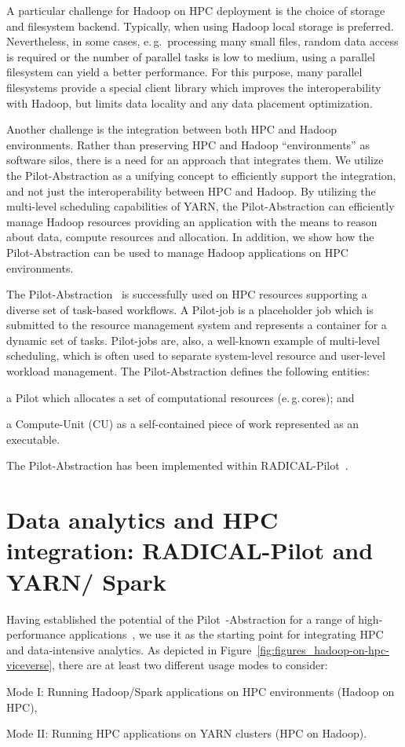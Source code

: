 A particular challenge for Hadoop on HPC deployment is the choice of storage and filesystem backend.
Typically, when using Hadoop local storage is preferred.
Nevertheless, in some cases, e.\,g.\ processing many small files, random data access is required or the number of parallel tasks is low to medium, using a parallel filesystem can yield a better performance.
For this purpose, many parallel filesystems provide a special client library which improves the interoperability with Hadoop, but limits data locality and any data placement optimization.

Another challenge is the integration between both HPC and Hadoop environments.
Rather than preserving HPC and Hadoop ``environments'' as software silos, there is a need for an approach that integrates them. 
We utilize the Pilot-Abstraction as a unifying concept to efficiently support the integration, and not just the interoperability between HPC and Hadoop.
By utilizing the multi-level scheduling capabilities of YARN, the Pilot-Abstraction can efficiently manage Hadoop resources providing an application with the means to reason about data, compute resources and allocation.
In addition, we show how the Pilot-Abstraction can be used to manage Hadoop applications on HPC environments.

The Pilot-Abstraction~\cite{luckow2012pstar} is successfully used on HPC resources supporting a diverse set of task-based workflows.
A Pilot-job is a placeholder job which is submitted to the resource management system and represents a container for a dynamic set of tasks.
Pilot-jobs are, also, a well-known example of multi-level scheduling, which is often used to separate system-level resource and user-level workload management.
The Pilot-Abstraction defines the following entities:
\begin{inparaenum} [1)]
    \item a Pilot which allocates a set of computational resources (e.\,g.\,cores); and
    \item  a Compute-Unit (CU) as a self-contained piece of work represented as an executable.
\end{inparaenum}
The Pilot-Abstraction has been implemented within RADICAL-Pilot~\cite{merzky2018design}.


\section{Data analytics and HPC integration: RADICAL-Pilot and YARN/ Spark}
\label{sec:integration_mode}
Having established the potential of the Pilot~-Abstraction for a range of high-performance applications~\cite{treikalis2016repex,ragothaman2014developing,ko2014numerical}, we use it as the starting point for integrating HPC and data-intensive analytics.
As depicted in Figure~\ref{fig:figures_hadoop-on-hpc-viceverse}, there are at least two different usage modes to consider:
\begin{inparaenum}[1)]
    \item Mode I: Running Hadoop/Spark applications on HPC environments (Hadoop on HPC),
    \item Mode II: Running HPC applications on YARN clusters (HPC on Hadoop).
\end{inparaenum}

